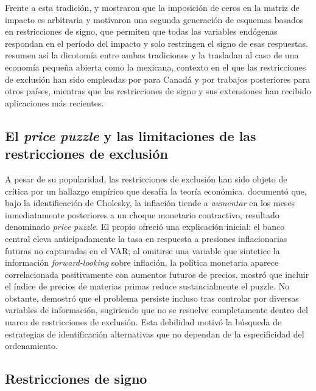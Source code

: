 \documentclass[12pt,a4paper]{article}
\begin{document}
Frente a esta tradición, \citet{faust1998} y \citet{canovadenicolo2002} mostraron que
la imposición de ceros en la matriz de impacto es arbitraria y motivaron una segunda
generación de esquemas basados en restricciones de signo, que permiten que todas las
variables endógenas respondan en el período del impacto y solo restringen el signo de
esas respuestas. \citet{carrilloelizondo2018} resumen así la dicotomía entre ambas
tradiciones y la trasladan al caso de una economía pequeña abierta como la mexicana,
contexto en el que las restricciones de exclusión han sido empleadas por
\citet{cushmanZha1997} para Canadá y por trabajos posteriores para otros países, mientras
que las restricciones de signo y sus extensiones han recibido aplicaciones más recientes.

\subsection{El \textit{price puzzle} y las limitaciones de las restricciones de exclusión}

A pesar de su popularidad, las restricciones de exclusión han sido objeto de crítica
por un hallazgo empírico que desafía la teoría económica.
\citet{sims1992} documentó que, bajo la identificación de Cholesky, la inflación tiende
a \textit{aumentar} en los meses inmediatamente posteriores a un choque monetario
contractivo, resultado denominado \textit{price puzzle}.
El propio \citet{sims1992} ofreció una explicación inicial: el banco central eleva
anticipadamente la tasa en respuesta a presiones inflacionarias futuras no capturadas
en el VAR; al omitirse una variable que sintetice la información \textit{forward-looking}
sobre inflación, la política monetaria aparece correlacionada positivamente con
aumentos futuros de precios.
\citet{eichenbaum1992} mostró que incluir el índice de precios de materias primas
reduce sustancialmente el puzzle.
No obstante, \citet{hanson2004} demostró que el problema persiste incluso tras controlar
por diversas variables de información, sugiriendo que no se resuelve completamente dentro
del marco de restricciones de exclusión.
Esta debilidad motivó la búsqueda de estrategias de identificación alternativas que no
dependan de la especificidad del ordenamiento.

\subsection{Restricciones de signo}
\end{document}
